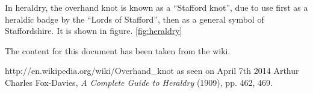\documentclass[a4paper,12pt]{article}
\begin{document}
In heraldry, the overhand knot is known as a ``Stafford knot'', due to use 
first as a heraldic badge by the ``Lords of Stafford'', then as a general 
symbol of Staffordshire. \cite{heraldry} It is shown in figure. \ref{fig:heraldry}


The content for this document has been taken from the wiki.\cite{wiki}

\begin{thebibliography}{99}
 http://en.wikipedia.org/wiki/Overhand\_knot as seen on April 7th 
2014
 Arthur Charles Fox-Davies, \emph{A Complete Guide to 
Heraldry} (1909), pp. 462, 469.
\end{thebibliography}
\end{document}
